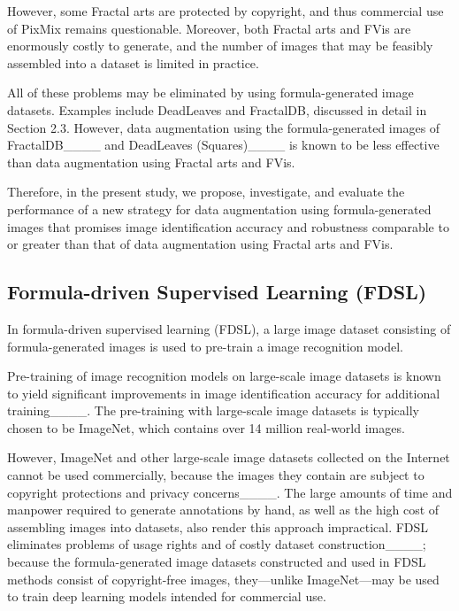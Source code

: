However, some Fractal arts are protected by
copyright, and thus commercial use of PixMix
remains questionable.
Moreover, both Fractal arts and FVis are enormously
costly to generate, and the number of images
that may be feasibly assembled into a dataset
is limited in practice.

All of these problems may be eliminated by using
formula-generated image datasets. Examples include
DeadLeaves and FractalDB, discussed in detail in Section 2.3.
However, data augmentation using the formula-generated images
of FractalDB____ and DeadLeaves (Squares)____
is known to be less effective than data augmentation
using Fractal arts and FVis.

Therefore, in the present study, we propose, investigate, and
evaluate the performance of a new strategy for
data augmentation using formula-generated images
that promises image identification accuracy and robustness
comparable to or greater than that of data augmentation
using Fractal arts and FVis.



\subsection{Formula-driven Supervised Learning (FDSL)}
\label{sec:FDSL}

In formula-driven supervised learning (FDSL),
a large image dataset consisting of formula-generated images
is used to pre-train a image recognition model.

Pre-training of image recognition models on large-scale image datasets
is known to yield significant improvements in image identification accuracy
for additional training____.
The pre-training with large-scale image datasets is typically chosen to be ImageNet, which contains over 14 million real-world images.

However, ImageNet and other large-scale image datasets collected on the Internet
cannot be used commercially, because the images they
contain are subject to copyright protections and
privacy concerns____.
The large amounts of time and manpower required to
generate annotations by hand, as well as the high cost of
assembling images into datasets, also render this approach impractical.
FDSL eliminates problems of usage rights
and of costly dataset construction____;
because the formula-generated image datasets constructed
and used in FDSL methods consist of copyright-free
images, they---unlike ImageNet---may be used to train deep learning
models intended for commercial use.


